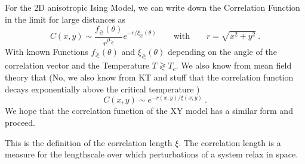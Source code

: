 	
	For the 2D anisotropic Ising Model, we can write down the Correlation Function in the limit for large distances as
	\begin{equation}
		C(x, y) \sim \frac{f_\gtrless(\theta)}{r^{\vartheta_\gtrless}} 	e^{-r /	\xi_\gtrless(\theta)} \qquad \text{with} \qquad r =	\sqrt{x^2 + y^2} ~.
	\end{equation} 
	With known Functions $f_\gtrless(\theta)$ and $\xi_\gtrless(\theta)$ depending on the angle of the correlation vector and the Temperature $ T \gtrless T_c$. We also know from mean field theory that (No, we also know from KT and stuff that the correlation function decays exponentially above the critical temperature \cite{kosterlitz1974critical, amit1980renormalisation})
	\begin{equation}
		C(x, y) \sim e^{-r(x,y) /	\xi(x,y)}~.
	\end{equation}	
	We hope that the correlation function of the XY model has a similar form and proceed. 
	
	This is the definition of the correlation length $\xi$. The correlation length is a measure for the lengthscale over which perturbations of a system relax in space. 
	
